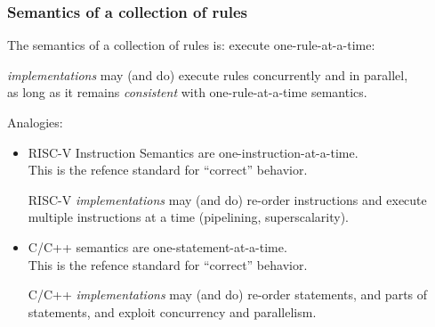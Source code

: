 \begin{frame}[fragile]
\frametitle{Semantics of a collection of rules}

\footnotesize

The semantics of a collection of {\BSV} rules is: execute one-rule-at-a-time:

\begin{center}
\end{center}

{\BSV} \emph{implementations} may (and do) execute rules concurrently and in parallel, \\
as long as it remains \emph{consistent} with one-rule-at-a-time semantics.

\vspace{4ex}

Analogies:
\begin{itemize}
 \item RISC-V Instruction Semantics are one-instruction-at-a-time. \\
       This is the refence standard for ``correct'' behavior.

       RISC-V \emph{implementations} may (and do) re-order
       instructions and execute multiple instructions at a time
       (pipelining, superscalarity).

 \item C/C++ semantics are one-statement-at-a-time. \\
       This is the refence standard for ``correct'' behavior.

       C/C++ \emph{implementations} may (and do) re-order statements,
       and parts of statements, and exploit concurrency and
       parallelism.
\end{itemize}

\end{frame}


